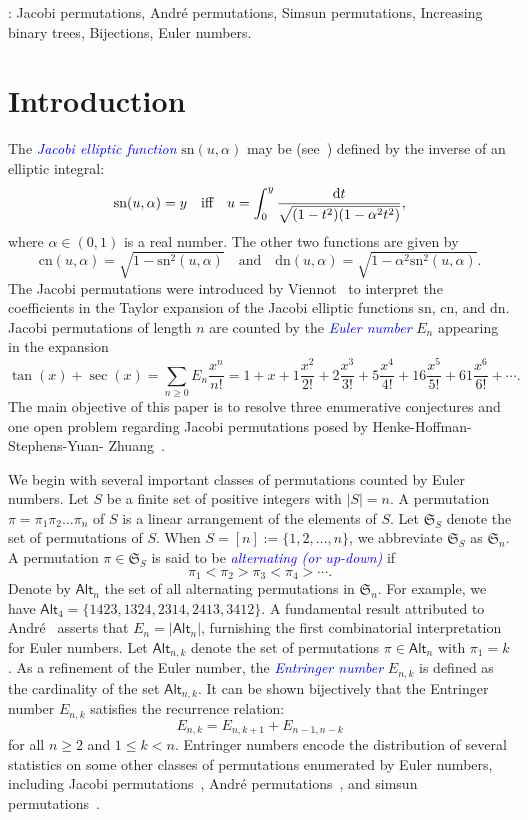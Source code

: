 \documentclass[12pt]{article}
\def\blue{\textcolor{blue}}
\def\blue{\textcolor{blue}}
\numberwithin{equation}{section}
\def\blue{\textcolor{blue}}
\def\blue{\textcolor{blue}}
\theoremstyle{plain}
\def\Alt{\mathsf{Alt}}
\def\sn{\mathrm{sn}}
\def\cn{\mathrm{cn}}
\def\dn{\mathrm{dn}}
\newcommand{\der}{{\rm{d}}}
\def\S{\mathfrak{S}}
\begin{document}
	\vskip0.1in
	:   Jacobi permutations,  Andr\'e permutations,  Simsun permutations, Increasing binary trees, Bijections, Euler numbers.
	
	
	
	
	
	
	
	
	
	\section{Introduction}
	 The \blue{\em Jacobi elliptic function} $\sn(u,\alpha)$ may be (see~\cite{Flajolet1989,Vie80}) defined by the inverse of an elliptic integral:
$$
\sn(u,\alpha)=y\quad\text{iff}\quad u=\int_0^y\frac{\der t}{\sqrt{(1-t^2)(1-\alpha^2t^2)}},
$$
where $\alpha\in(0,1)$ is a real number. The other two functions are given by
$$
\cn(u,\alpha)=\sqrt{1-\sn^2(u,\alpha)}\quad\text{and}\quad \dn(u,\alpha)=\sqrt{1-\alpha^2\sn^2(u,\alpha)}.
$$
  The Jacobi permutations were   introduced   by Viennot~\cite{Vie80}  to
interpret the coeﬃcients in the Taylor expansion of the Jacobi elliptic functions $\sn$, $\cn$, and $\dn$. Jacobi permutations of length $n$ are  counted by the \blue{\em Euler number}
  $E_n$ appearing in the expansion 
  $$
  \tan(x)+\sec(x)=\sum_{n\geq0}E_n\frac{x^n}{n!}=1+x+1\frac{x^2}{2!}+2\frac{x^3}{3!}+5\frac{x^4}{4!}+16\frac{x^5}{5!}+61\frac{x^6}{6!}+\cdots.
  $$
  The main objective of this paper is to resolve three enumerative conjectures and one open problem regarding Jacobi permutations posed by Henke-Hoffman-Stephens-Yuan- Zhuang~\cite{HHSSY25}.
  
We begin with several important classes of permutations counted by Euler numbers.  Let $S$ be  a finite set  of positive integers with $|S|=n$.  A  permutation $\pi=\pi_1\pi_2\ldots \pi_n$ of $S$ is a linear arrangement of the elements of  $S$.  Let $\mathfrak{S}_S$ denote the set of permutations of $S$. When $S=[n]:=\{1,2,\ldots, n\}$, we abbreviate $\S_S$ as  $\S_n$. 
A permutation $\pi\in\S_S$  is said  to be   \blue{\em alternating  (or up-down) } if 
   $$\pi_1<\pi_2>\pi_3<\pi_4>\cdots.$$   
   Denote by $\Alt_n$ the set of all alternating  permutations in $\S_n$. For example,  we have 
   $\Alt_4=\{1423, 1324, 2314, 2413, 3412\}$.  A fundamental result attributed to Andr\'e~\cite{And79} asserts  that $E_n=|\Alt_n|$, furnishing the first combinatorial interpretation for Euler numbers.   Let $\Alt_{n,k}$ denote the  set of   permutations $\pi\in \Alt_n$ with $\pi_1=k$.    
   As a refinement of the Euler number, the \blue{\em Entringer number}  $E_{n,k}$ \cite{Ent66} is defined  as the cardinality of the set $\Alt_{n,k}$.  It can be shown bijectively that the  Entringer number $E_{n,k}$ satisfies the  recurrence relation:
   $$
   E_{n,k}=E_{n,k+1}+E_{n-1, n-k}
   $$
   for all $n\geq 2$ and $1\leq k<n$.   
   Entringer numbers encode the distribution of several statistics on some other classes of permutations enumerated by Euler numbers, including Jacobi permutations~\cite{HHSSY25}, André permutations~\cite{FH16}, and simsun permutations~\cite{Lin}. 
\end{document}
